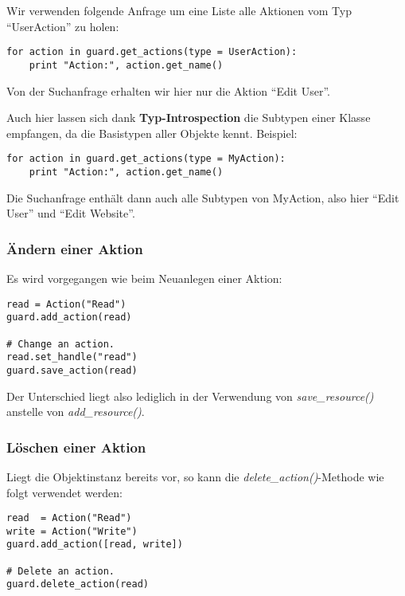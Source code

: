 \begin{enumerate}
Wir verwenden folgende Anfrage um eine Liste alle Aktionen vom Typ 
``UserAction'' zu holen:

\begin{lstlisting}
for action in guard.get_actions(type = UserAction):
    print "Action:", action.get_name()
\end{lstlisting}

Von der Suchanfrage erhalten wir hier nur die Aktion ``Edit User''.

Auch hier lassen sich dank {\bf Typ-Introspection} die Subtypen einer 
Klasse empfangen, da \product die Basistypen aller Objekte kennt.
Beispiel:

\begin{lstlisting}
for action in guard.get_actions(type = MyAction):
    print "Action:", action.get_name()
\end{lstlisting}

Die Suchanfrage enthält dann auch alle Subtypen von MyAction, also hier 
``Edit User'' und ``Edit Website''.
\end{enumerate}


\subsubsection{Ändern einer Aktion}

Es wird vorgegangen wie beim Neuanlegen einer Aktion:

\begin{lstlisting}
read = Action("Read")
guard.add_action(read)

# Change an action.
read.set_handle("read")
guard.save_action(read)
\end{lstlisting}

Der Unterschied liegt also lediglich in der Verwendung von 
{\it save\_resource()} anstelle von {\it add\_resource()}.


\subsubsection{Löschen einer Aktion}

Liegt die Objektinstanz bereits vor, so kann die 
{\it delete\_action()}-Methode wie folgt verwendet werden:

\begin{lstlisting}
read  = Action("Read")
write = Action("Write")
guard.add_action([read, write])

# Delete an action.
guard.delete_action(read)
\end{lstlisting}

